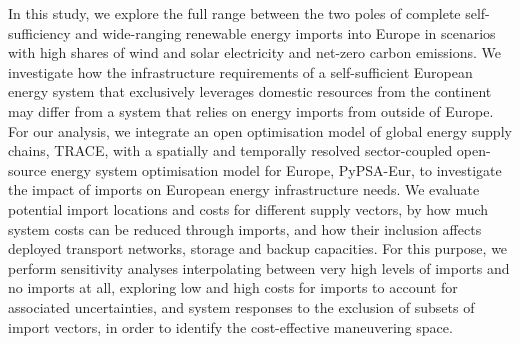 In this study, we explore the full range between the two poles of complete
self-sufficiency and wide-ranging renewable energy imports into Europe in
scenarios with high shares of wind and solar electricity and net-zero carbon
emissions. We investigate how the infrastructure requirements of a
self-sufficient European energy system that exclusively leverages domestic
resources from the continent may differ from a system that relies on energy
imports from outside of Europe. For our analysis, we integrate an open
optimisation model of global energy supply chains,
TRACE,\cite{hamppImportOptions2023} with a spatially and temporally resolved
sector-coupled open-source energy system optimisation model for Europe,
PyPSA-Eur,\cite{PyPSAEurSecSectorCoupledOpen} to investigate the impact of imports
on European energy infrastructure needs. We evaluate potential import locations
and costs for different supply vectors, by how much system costs can be reduced
through imports, and how their inclusion affects deployed transport networks,
storage and backup capacities. For this purpose, we perform sensitivity analyses
interpolating between very high levels of imports and no imports at all,
exploring low and high costs for imports to account for associated
uncertainties, and system responses to the exclusion of subsets of import
vectors, in order to identify the cost-effective maneuvering space.


